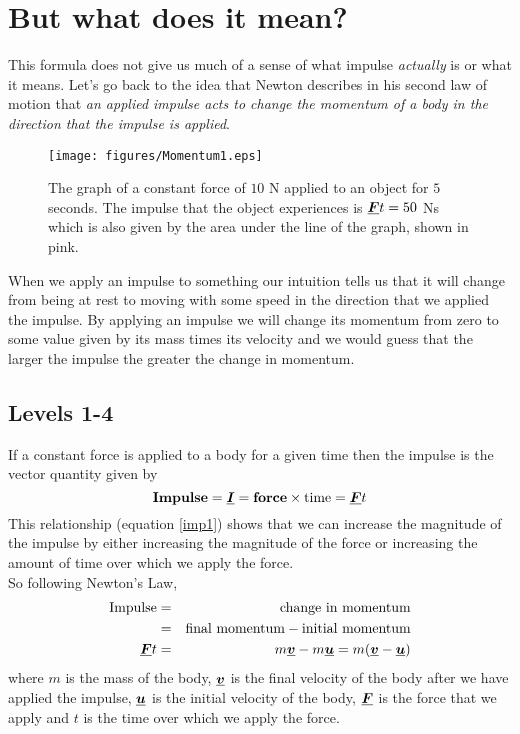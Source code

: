 \section{But what does it mean?}
This formula does not give us much of a sense of what impulse {\it actually} is or what it means.  Let's go back to the idea that Newton describes in his second law of motion that {\it an applied impulse acts to change the momentum of a body in the direction that the impulse is applied}.\\

\begin{wrapfigure}{r}{7cm} 
\center
\texttt{[image: figures/Momentum1.eps]}
\caption{The graph of a constant force of $10$ N applied to an object for $5$ seconds.  The impulse that the object experiences is ${\mathit{\underline{\boldsymbol{F}}}}t = 50$ Ns which is also given by the area under the line of the graph, shown in pink.}\label{impulse1}
\end{wrapfigure}

\noindent When we apply an impulse to something our intuition tells us that it will change from being at rest to moving with some speed in the direction that we applied the impulse.  By applying an impulse we will change its momentum from zero to some value given by its mass times its velocity and we would guess that the larger the impulse the greater the change in momentum.

\subsection*{Levels 1-4}
If a constant force is applied to a body for a given time then the impulse is the vector quantity given by
\begin{equation} \label{imp1}
\mbox{\bf Impulse} = \mathit{\underline{\boldsymbol{I}}} = \mbox{\bf force} \times \mbox{time} ={\mathit{\underline{\boldsymbol{F}}}}t
\end{equation}
This relationship (equation \ref{imp1}) shows that we can increase the magnitude of the impulse by either increasing the magnitude of the force or increasing the amount of time over which we apply the force.\\

\noindent So following Newton's Law,
\begin{eqnarray}
\mbox{Impulse}&=&\mbox{change in momentum}\nonumber \\
&=&\mbox{final momentum} - \mbox{initial momentum}\nonumber \\
{\mathit{\underline{\boldsymbol{F}}}}t &=& m{\mathit{\underline{\boldsymbol{v}}}}-m{\mathit{\underline{\boldsymbol{u}}}} = m({\mathit{\underline{\boldsymbol{v}}}}-{\mathit{\underline{\boldsymbol{u}}}})
\end{eqnarray}
where $m$ is the mass of the body, ${\mathit{\underline{\boldsymbol{v}}}}$ is the final velocity of the body after we have applied the impulse, ${\mathit{\underline{\boldsymbol{u}}}}$ is the initial velocity of the body, ${\mathit{\underline{\boldsymbol{F}}}}$ is the force that we apply and $t$ is the time over which we apply the force.\\

